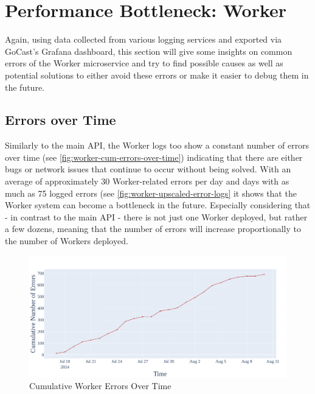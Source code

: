 
\section{Performance Bottleneck: Worker}

Again, using data collected from various logging services and exported via GoCast's Grafana dashboard, this section will give some insights on common errors of the Worker microservice and try to find possible causes as well as potential solutions to either avoid these errors or make it easier to debug them in the future.  

\subsection{Errors over Time}

Similarly to the main \ac{API}, the Worker logs too show a constant number of errors over time (see \autoref{fig:worker-cum-errors-over-time}) indicating that there are either bugs or network issues that continue to occur without being solved. With an average of approximately 30 Worker-related errors per day and days with as much as 75 logged errors (see \autoref{fig:worker-upscaled-error-logs} it shows that the Worker system can become a bottleneck in the future. Especially considering that - in contrast to the main \ac{API} - there is not just one Worker deployed, but rather a few dozens, meaning that the number of errors will increase proportionally to the number of Workers deployed. 

\begin{figure}[htpb]
    \centering
    \includegraphics[width=\linewidth]{images/plots/worker/cum_errors_over_time.png}
    \caption[Cumulative Worker Errors Over Time]{Cumulative Worker Errors Over Time}\label{fig:worker-cum-errors-over-time}
\end{figure}

